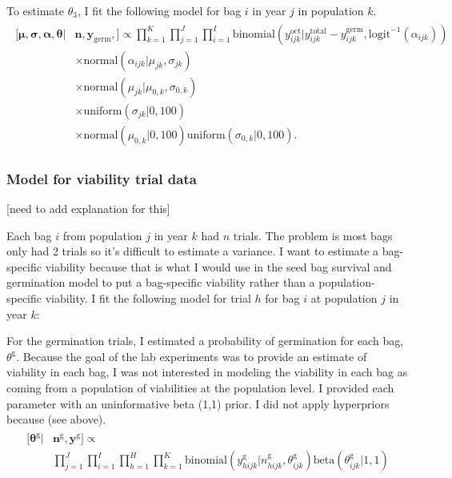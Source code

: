 \documentclass[12pt, oneside, titlepage]{article}   	%
\begin{document}
To estimate $\theta_3$, I fit the following model for bag $i$ in year $j$ in population $k$. 
%
\begin{align}
  \begin{split}
 [ \bm{\mu}, \bm{\sigma}, \bm{\alpha}, \bm{\theta} | & \bm{n}, \bm{y_{\mathrm{germ}}},  ] \propto  \prod_{k=1}^{K} \prod_{j=1}^{J} \prod_{i=1}^{I} 
   \mathrm{binomial} ( y^{\mathrm{oct}}_{ijk} | y^{\mathrm{total}}_{ijk}-y^{\mathrm{germ}}_{ijk}, \mathrm{logit}^{-1}( \alpha_{ijk} ) ) 
   \\ & \times \mathrm{normal} ( \alpha_{ijk}  | \mu_{jk}, \sigma{_{jk} })
  \\ & \times \mathrm{normal} ( \mu_{jk}  | \mu_{0,k}, \sigma{_{0,k} })
  \\ & \times \mathrm{uniform} ( \sigma_{jk} | 0,100)
  \\ & \times \mathrm{normal} ( \mu_{0,k} | 0 , 100 ) \mathrm{uniform} ( \sigma_{0,k} | 0,100).
  \end{split}
\end{align}
%
\fi

\subsubsection*{Model for viability trial data}

[need to add explanation for this]

\iffalse
Each bag $i$ from population $j$ in year $k$ had $n$ trials. The problem is most bags only had 2 trials so it's difficult to estimate a variance. I want to estimate a bag-specific viability because that is what I would use in the seed bag survival and germination model to put a bag-specific viability rather than a population-specific viability. I fit the following model for trial $h$ for bag $i$ at population $j$ in year $k$:

For the germination trials, I estimated a probability of germination for each bag, $\theta^\mathrm{g}$. Because the goal of the lab experiments was to provide an estimate of viability in each bag, I was not interested in modeling the viability in each bag as coming from a population of viabilities at the population level. I provided each parameter with an uninformative beta (1,1) prior. I did not apply hyperpriors because (see above).
%
\begin{align}
  \begin{split}
 [\bm{\theta^{\mathrm{g}}} | & \bm{n^{\mathrm{g}}}, \bm{y^{\mathrm{g}}} ] \propto
 \\  & \prod_{j=1}^{J} \prod_{i=1}^{I}  \prod_{h=1}^{H} \prod_{k=1}^{K}  \mathrm{binomial} ( y^{\mathrm{g}}_{hijk} | n^{\mathrm{g}}_{hijk}, \theta^{\mathrm{g}}_{ijk} )
\mathrm{beta} (  \theta^{\mathrm{g}}_{ijk} | 1 , 1 )
  \end{split}
\end{align}
\end{document}
